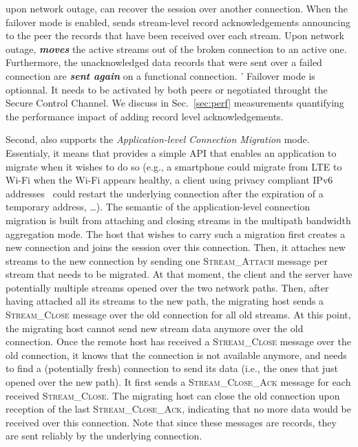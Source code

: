 upon network outage, \tcpls can recover the session over another \tcp
connection. When the failover mode is enabled, \tcpls sends stream-level record
acknowledgements announcing to the peer the records that have been received
over each stream. Upon network outage, \tcpls \textbf{\textit{moves}} the
active streams out of the broken \tcp connection to an active one. Furthermore,
the unacknowledged data records that were sent over a failed \tcp connection are
\textbf{\textit{sent again}} on a functional \tcp connection.
\tcpls' Failover mode is optionnal. It needs to be activated by both peers or
negotiated throught the Secure Control Channel.
We discuss in Sec.~\ref{sec:perf} measurements quantifying the
performance impact of adding \tcpls record level acknowledgements.

Second, \tcpls also supports the \textit{Application-level Connection Migration}
mode. Essentialy, it means that \tcpls provides a simple API that enables an
application to migrate when it wishes to do so (e.g., a smartphone could migrate
from LTE to Wi-Fi when the Wi-Fi appears healthy, a client using privacy
compliant IPv6 addresses~\cite{rfc4941} could restart the underlying \tcp
connection after the expiration of a temporary address, \ldots). The semantic of
the application-level connection migration is built from attaching and closing
streams in the multipath bandwidth aggregation mode. The host that wishes to
carry such a migration first creates a new \tcp connection and joins the \tcpls
session over this connection. Then, it attaches new streams to the new
connection by sending one \textsc{Stream\_Attach} message per stream that needs
to be migrated. At that moment, the client and the server have potentially
multiple streams opened over the two network paths. Then, after having attached
all its streams to the new path, the migrating host sends a
\textsc{Stream\_Close} message over the old \tcp connection for all old streams.
At this point, the migrating host cannot send new stream data anymore over the
old connection. Once the remote host has received a \textsc{Stream\_Close}
message over the old \tcp connection, it knows that the connection is not
available anymore, and needs to find a (potentially fresh) connection to send
its data (i.e., the ones that just opened over the new path). It first sends a
\textsc{Stream\_Close\_Ack} message for each received \textsc{Stream\_Close}.
The migrating host can close the old connection upon reception of the last
\textsc{Stream\_Close\_Ack}, indicating that no more data would be received over
this connection. Note that since these messages are \tls records, they are sent
reliably by the underlying \tcp connection.

